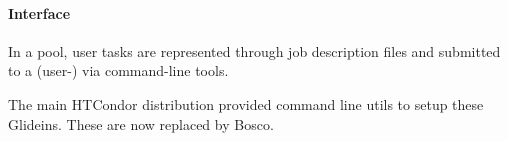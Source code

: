 \documentclass{sig-alternate}
\begin{document}

\paragraph{Interface}

In a pool, user tasks are represented through job description files and
submitted to a (user-) via command-line tools.

The main HTCondor distribution provided command line utils to setup these
Glideins. These are now replaced by Bosco.
%


%
\end{document}
